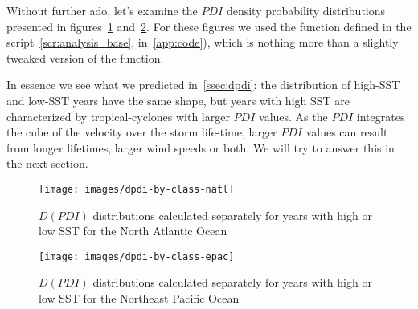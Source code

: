 Without further ado, let's examine the $PDI$ density probability distributions presented in figures~\ref{fig:dpdi-by-class-natl} and~\ref{fig:dpdi-by-class-epac}. For these figures we used the  function defined in the script~\ref{scr:analysis_base}, in~\cref{app:code}), which is nothing more than a slightly tweaked version of the  function.

In essence we see what we predicted in~\cref{ssec:dpdi}: the distribution of high-SST and low-SST years have the same shape, but years with high SST are characterized by tropical-cyclones with larger $PDI$ values. As the $PDI$ integrates the cube of the velocity over the storm life-time, larger $PDI$ values can result from longer lifetimes, larger wind speeds or both. We will try to answer this in the next section.
\begin{figure}[H]
	\centering
	\texttt{[image: images/dpdi-by-class-natl]}
	\caption{$D(PDI)$ distributions calculated separately for years with high or low SST for the North Atlantic Ocean}
	\label{fig:dpdi-by-class-natl}
\end{figure}

\begin{figure}[H]
	\centering
	\texttt{[image: images/dpdi-by-class-epac]}
	\caption{$D(PDI)$ distributions calculated separately for years with high or low SST for the Northeast Pacific Ocean}
	\label{fig:dpdi-by-class-epac}
\end{figure}


